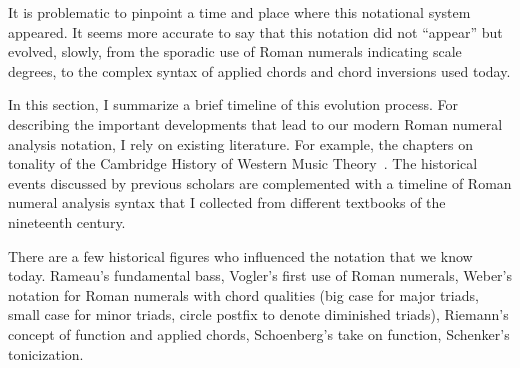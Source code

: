  It is
problematic to pinpoint a time and place where this
notational system appeared. It seems more accurate to say
that this notation did not ``appear'' but evolved, slowly,
from the sporadic use of Roman numerals indicating scale
degrees, to the complex syntax of applied chords and chord
inversions used today.

In this section, I summarize a brief timeline of this
evolution process. For describing the important
developments that lead to our modern Roman numeral
analysis notation, I rely on existing literature. For
example, the chapters on tonality of the Cambridge History
of Western Music
Theory~\parencite{christensen2002tonality,
christensen2002rameau, christensen2002nineteenthcentury,
christensen2002heinrich}. The historical events discussed
by previous scholars are complemented with a timeline of
Roman numeral analysis syntax that I collected from
different textbooks of the nineteenth century.

 There are a few historical
figures who influenced the notation that we know today.
Rameau's fundamental bass, Vogler's first use of Roman
numerals, Weber's notation for Roman numerals with chord
qualities (big case for major triads, small case for minor
triads, circle postfix to denote diminished triads),
Riemann's concept of function and applied chords,
Schoenberg's take on function, Schenker's tonicization.

